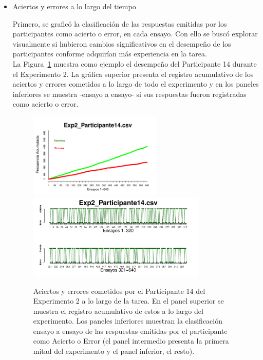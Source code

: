 \begin{itemize}
	\item Aciertos y errores a lo largo del tiempo

Primero, se graficó la clasificación de las respuestas emitidas por los participantes como acierto o error, en cada ensayo. Con ello se buscó explorar visualmente si hubieron cambios significativos en el desempeño de los participantes conforme adquirían más experiencia en la tarea.\\

La Figura~\ref{fig:Success_E2_P14} muestra como ejemplo el desempeño del Participante 14 durante el Experimento 2. La gráfica superior presenta el registro acumulativo de los aciertos y errores cometidos a lo largo de todo el experimento y en los paneles inferiores se muestra -ensayo a ensayo- si sus respuestas fueron registradas como acierto o error.\\

\begin{figure}[th]
\centering
\includegraphics[width=0.60\textwidth]{Figures/SuccessCumulative_Exp2_P14} \\
\includegraphics[width=0.80\textwidth]{Figures/Success_Exp2_P14}
\caption[Aciertos y errores a lo largo del tiempo: Participante ejemplar]{Aciertos y errores cometidos por el Participante 14 del Experimento 2 a lo largo de la tarea. En el panel superior se muestra el registro acumulativo de estos a lo largo del experimento. Los paneles inferiores muestran la clasificación ensayo a ensayo de las respuestas emitidas por el participante como Acierto o Error (el panel intermedio presenta la primera mitad del experimento y el panel inferior, el resto).}
\label{fig:Success_E2_P14}
\end{figure}


\end{itemize}
